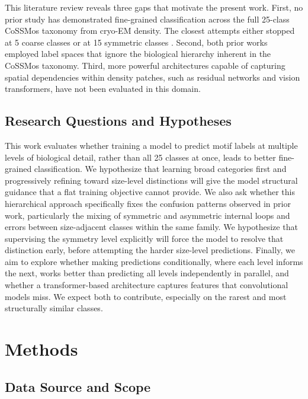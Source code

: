 \documentclass[sigconf]{acmart}
\begin{document}
This literature review reveals three gaps that motivate
the present work. First, no prior study has demonstrated
fine-grained classification across the full 25-class CoSSMos taxonomy
from cryo-EM density. The closest attempts either stopped at 5
coarse classes \cite{murugadass2026} or at 15 symmetric classes
\cite{mbaku2025}. Second, both prior works
employed label spaces that ignore the biological hierarchy
inherent in the CoSSMos taxonomy. Third, more powerful  architectures
capable of capturing spatial dependencies within density
patches, such as residual networks and vision transformers, have not
been evaluated in this domain.

\subsection{Research Questions and Hypotheses}
This work evaluates whether training a model to predict motif labels at multiple levels of biological detail, rather than all 25 classes at once, leads to better fine-grained classification. We hypothesize that learning broad categories first and progressively refining toward size-level distinctions will give the model structural guidance that a flat training objective cannot provide.
We also ask whether this hierarchical approach specifically fixes the confusion patterns observed in prior work, particularly the mixing of symmetric and asymmetric internal loops and errors between size-adjacent classes within the same family. We hypothesize that supervising the symmetry level explicitly will force the model to resolve that distinction early, before attempting the harder size-level predictions.
Finally, we aim to explore whether making predictions conditionally, where each level informs the next, works better than predicting all levels independently in parallel, and whether a transformer-based architecture captures features that convolutional models miss. We expect both to contribute, especially on the rarest and most structurally similar classes.


\section{Methods}
 
\subsection{Data Source and Scope}
\end{document}
